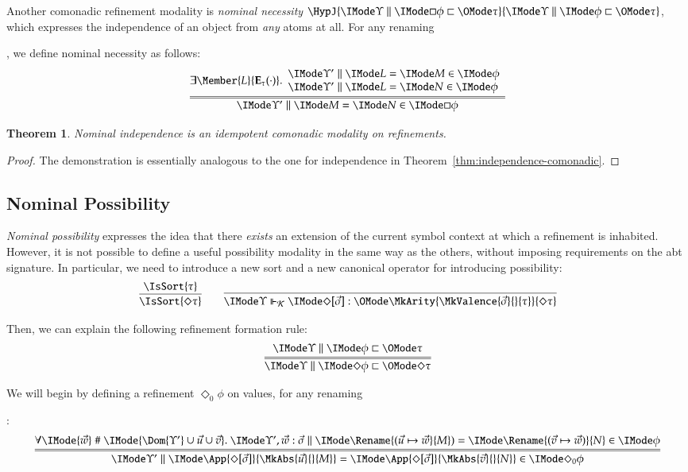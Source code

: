 \documentclass[11pt]{article}
\newtheorem{thm}{Theorem}[section]
\theoremstyle{definition}
\theoremstyle{notation}
\theoremstyle{remark}
\numberwithin{equation}{section}
\newcommand\Exprs{\mathbf{E}}
\begin{document}
Another comonadic refinement modality is \emph{nominal necessity}
$\HypJ{\Refines{\Upsilon}{\Box\phi}{\tau}}{\Refines{\Upsilon}{\phi}{\tau}}$,
which expresses the independence of an object from \emph{any} atoms at all. For
any renaming
%
, we define nominal necessity as follows:
\[
  \infer={
    \RMemEq{\Upsilon'}{M}{N}{\Box\phi}
  }{
    \exists\Member{L}{\Exprs_\tau(\cdot)}.
    \begin{array}{l}
      \RMemEq{\Upsilon'}{L}{M}{\phi}\\
      \RMemEq{\Upsilon'}{L}{N}{\phi}
    \end{array}
  }
\]

\begin{thm}
  Nominal independence is an idempotent comonadic modality on refinements.
\end{thm}
\begin{proof}
  The demonstration is essentially analogous to the one for independence in
  Theorem~\ref{thm:independence-comonadic}.
\end{proof}

\subsection{Nominal Possibility}

\emph{Nominal possibility} expresses the idea that there \emph{exists} an
extension of the current symbol context at which a refinement is inhabited.
However, it is not possible to define a useful possibility modality in the same
way as the others, without imposing requirements on the abt signature. In
particular, we need to introduce a new sort and a new canonical operator for
introducing possibility:
\[
  \infer{
    \IsSort{\Diamond\tau}
  }{
    \IsSort{\tau}
  }\qquad
  \infer{
    \IsCanOperator{\Upsilon}{\Diamond[\vec{\sigma}]}{
      \MkArity{
        \MkValence{\vec{\sigma}}{}{\tau}
      }{\Diamond\tau}
    }
  }{
  }
\]

Then, we can explain the following refinement formation rule:
\[
  \infer={
    \Refines{\Upsilon}{\Diamond\phi}{\Diamond\tau}
  }{
    \Refines{\Upsilon}{\phi}{\tau}
  }
\]

We will begin by defining a refinement $\Diamond_0\phi$ on values, for any renaming
%
:
\[
  \infer={
    \RMemEq{\Upsilon'}{
      \App{
        \Diamond[\vec{\sigma}]
      }{
        \MkAbs{\vec{u}}{}{M}
      }
    }{
      \App{
        \Diamond[\vec{\sigma}]
      }{
        \MkAbs{\vec{v}}{}{N}
      }
    }{\Diamond_0\phi}
  }{
    \forall\IMode{\vec{w}}\mathrel{\#}\IMode{\Dom{\Upsilon'}\cup\vec{u}\cup\vec{v}}.\
    \RMemEq{\Upsilon',\vec{w}:\vec{\sigma}}{\Rename{(\vec{u}\mapsto\vec{w}}{M})}{\Rename{(\vec{v}\mapsto\vec{w})}{N}}{\phi}
  }
\]
\end{document}

